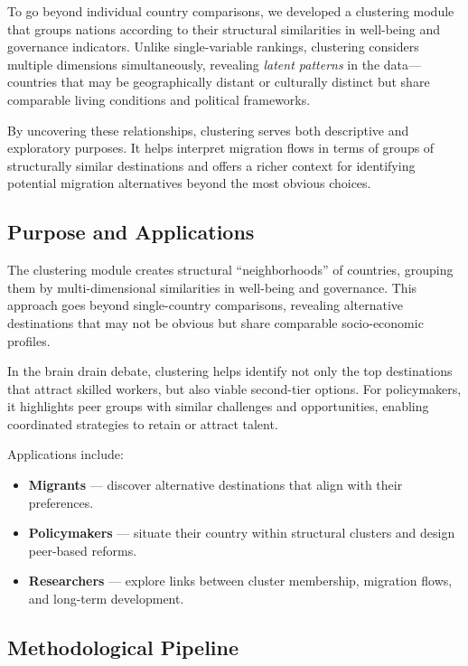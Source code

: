 \documentclass[11pt]{article}
\begin{document}
\noindent
To go beyond individual country comparisons, we developed a clustering module that groups nations according to their structural similarities in well-being and governance indicators.  
Unlike single-variable rankings, clustering considers multiple dimensions simultaneously, revealing \textit{latent patterns} in the data—countries that may be geographically distant or culturally distinct but share comparable living conditions and political frameworks.

\noindent
By uncovering these relationships, clustering serves both descriptive and exploratory purposes. It helps interpret migration flows in terms of groups of structurally similar destinations and offers a richer context for identifying potential migration alternatives beyond the most obvious choices.

\subsection{Purpose and Applications}

The clustering module creates structural ``neighborhoods'' of countries, grouping them by multi-dimensional similarities in well-being and governance. This approach goes beyond single-country comparisons, revealing alternative destinations that may not be obvious but share comparable socio-economic profiles.  

\noindent
In the brain drain debate, clustering helps identify not only the top destinations that attract skilled workers, but also viable second-tier options. For policymakers, it highlights peer groups with similar challenges and opportunities, enabling coordinated strategies to retain or attract talent.  

\noindent
Applications include:  
\begin{itemize}
    \item \textbf{Migrants} --- discover alternative destinations that align with their preferences.  
    \item \textbf{Policymakers} --- situate their country within structural clusters and design peer-based reforms.  
    \item \textbf{Researchers} --- explore links between cluster membership, migration flows, and long-term development.  
\end{itemize}



\subsection{Methodological Pipeline}
\end{document}
